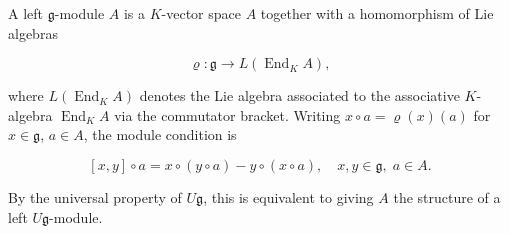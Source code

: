 A left $\mathfrak{g}$-module $A$ is a $K$-vector space $A$ together with a homomorphism of Lie algebras

$$\varrho: \mathfrak{g} \to L(\operatorname{End}_K A),$$

where $L(\operatorname{End}_K A)$ denotes the Lie algebra associated to the associative $K$-algebra $\operatorname{End}_K A$ via the commutator bracket. Writing $x \circ a = \varrho(x)(a)$ for $x \in \mathfrak{g}$, $a \in A$, the module condition is

$$[x, y] \circ a = x \circ (y \circ a) - y \circ (x \circ a), \quad x, y \in \mathfrak{g}, \; a \in A.$$

By the universal property of $U\mathfrak{g}$, this is equivalent to giving $A$ the structure of a left $U\mathfrak{g}$-module.
